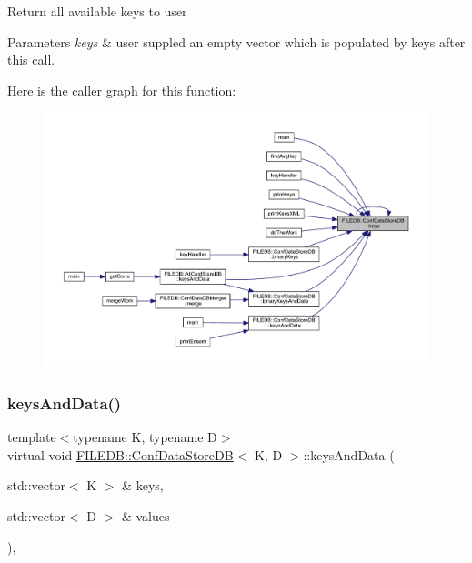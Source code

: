 Return all available keys to user 
\begin{DoxyParams}{Parameters}
{\em keys} & user suppled an empty vector which is populated by keys after this call. \\
\hline
\end{DoxyParams}
Here is the caller graph for this function\+:
\nopagebreak
\begin{figure}[H]
\begin{center}
\leavevmode
\includegraphics[width=350pt]{d8/d19/classFILEDB_1_1ConfDataStoreDB_a794e05e3888ab95e0396a196b5a18e65_icgraph}
\end{center}
\end{figure}
\mbox{\label{classFILEDB_1_1ConfDataStoreDB_a94333e6aab463fd336bffb28d81dd39d}} 
\subsubsection{\texorpdfstring{keysAndData()}{keysAndData()}\hspace{0.1cm}{\footnotesize\ttfamily [1/3]}}
{\footnotesize\ttfamily template$<$typename K, typename D$>$ \\
virtual void \mbox{\hyperlink{classFILEDB_1_1ConfDataStoreDB}{F\+I\+L\+E\+D\+B\+::\+Conf\+Data\+Store\+DB}}$<$ K, D $>$\+::keys\+And\+Data (\begin{DoxyParamCaption}\item[{std\+::vector$<$ K $>$ \&}]{keys,  }\item[{std\+::vector$<$ D $>$ \&}]{values }\end{DoxyParamCaption})\hspace{0.3cm}{\ttfamily [inline]}, {\ttfamily [virtual]}}

